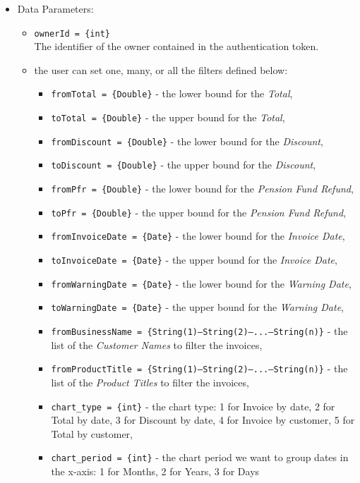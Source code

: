 \begin{itemize}
    \item Data Parameters:
    \begin{itemize}
        \item \texttt{ownerId = \{int\}} \\
        The identifier of the owner contained in the authentication token.
        \item the user can set one, many, or all the filters defined below:
        \begin{itemize}
            \item \texttt{fromTotal = \{Double\}} - the lower bound for the \textit{Total},
            \item \texttt{toTotal = \{Double\}} - the upper bound for the \textit{Total},
            \item \texttt{fromDiscount = \{Double\}} - the lower bound for the \textit{Discount},
            \item \texttt{toDiscount = \{Double\}} - the upper bound for the \textit{Discount},
            \item \texttt{fromPfr = \{Double\}} - the lower bound for the \textit{Pension Fund Refund},
            \item \texttt{toPfr = \{Double\}} - the upper bound for the \textit{Pension Fund Refund},
            \item \texttt{fromInvoiceDate = \{Date\}} - the lower bound for the \textit{Invoice Date},
            \item \texttt{toInvoiceDate = \{Date\}} - the upper bound for the \textit{Invoice Date},
            \item \texttt{fromWarningDate = \{Date\}} - the lower bound for the \textit{Warning Date},
            \item \texttt{toWarningDate = \{Date\}} - the upper bound for the \textit{Warning Date},
            \item \texttt{fromBusinessName = \{String(1)---String(2)---...---String(n)\}} - the list of the \textit{Customer Names} to filter the invoices,
            \item \texttt{fromProductTitle = \{String(1)---String(2)---...---String(n)\}} - the list of the \textit{Product Titles} to filter the invoices,
            \item \texttt{chart\_type = \{int\}} - the chart type: 1 for Invoice by date, 2 for Total by date, 3 for Discount by date, 4 for Invoice by customer, 5 for Total by customer,
            \item \texttt{chart\_period = \{int\}} - the chart period we want to group dates in the x-axis: 1 for Months, 2 for Years, 3 for Days
        \end{itemize}
    \end{itemize}


\end{itemize}
